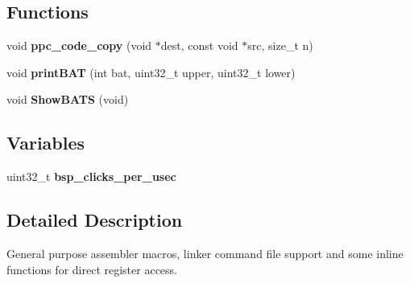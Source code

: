 \subsection*{Functions}
\begin{DoxyCompactItemize}
\item 
void {\bfseries ppc\+\_\+code\+\_\+copy} (void $\ast$dest, const void $\ast$src, size\+\_\+t n)
\item 
void {\bfseries print\+B\+AT} (int bat, uint32\+\_\+t upper, uint32\+\_\+t lower)
\item 
void {\bfseries Show\+B\+A\+TS} (void)
\end{DoxyCompactItemize}
\subsection*{Variables}
\begin{DoxyCompactItemize}
\item 
uint32\+\_\+t {\bfseries bsp\+\_\+clicks\+\_\+per\+\_\+usec}
\end{DoxyCompactItemize}


\subsection{Detailed Description}
General purpose assembler macros, linker command file support and some inline functions for direct register access. 

